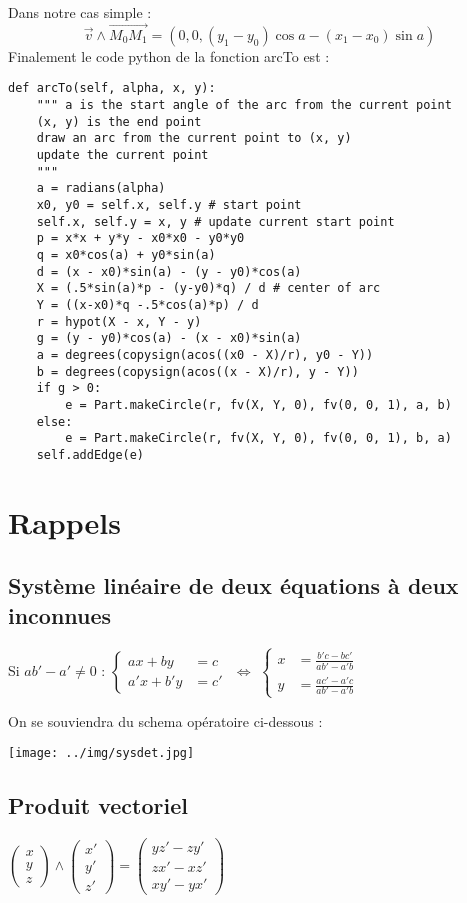 \documentclass[a4paper]{article}
\begin{document}
\bigskip
Dans notre cas simple :
\begin{equation}
\vec{v} \wedge \overrightarrow{M_0 M_1} = (0, 0, (y_1 - y_0)\cos a - (x_1 - x_0)\sin a)
\end{equation}
\bigskip
Finalement le code python de la fonction arcTo est :

\begin{lstlisting}
def arcTo(self, alpha, x, y):
	""" a is the start angle of the arc from the current point
	(x, y) is the end point
	draw an arc from the current point to (x, y)
	update the current point
	"""
	a = radians(alpha)
	x0, y0 = self.x, self.y # start point
	self.x, self.y = x, y # update current start point
	p = x*x + y*y - x0*x0 - y0*y0
	q = x0*cos(a) + y0*sin(a)
	d = (x - x0)*sin(a) - (y - y0)*cos(a)
	X = (.5*sin(a)*p - (y-y0)*q) / d # center of arc
	Y = ((x-x0)*q -.5*cos(a)*p) / d
	r = hypot(X - x, Y - y)
	g = (y - y0)*cos(a) - (x - x0)*sin(a)
	a = degrees(copysign(acos((x0 - X)/r), y0 - Y))
	b = degrees(copysign(acos((x - X)/r), y - Y))
	if g > 0:
		e = Part.makeCircle(r, fv(X, Y, 0), fv(0, 0, 1), a, b)
	else: 
		e = Part.makeCircle(r, fv(X, Y, 0), fv(0, 0, 1), b, a)
	self.addEdge(e)
\end{lstlisting}
\newpage
\section{Rappels}
\subsection{Système linéaire de deux équations à deux inconnues}

Si $ ab' - a' \not= 0 $ :
$\left\{
\begin{array}{ll}
ax + by &= c \\ 
a'x + b'y &= c' 
\end{array}
\right.$
$\Longleftrightarrow$
$\left\{
\begin{array}{ll}
x &= \displaystyle \frac{b'c - bc'}{ab' - a'b} \\
y &= \displaystyle \frac{ac' - a'c}{ab' - a'b}
\end{array}
\right.$

On se souviendra du schema opératoire ci-dessous :

\texttt{[image: ../img/sysdet.jpg]}

\subsection{Produit vectoriel}
$ \left(\begin{array}{l}x \\y \\	z\end{array}\right) \wedge
\left(\begin{array}{l}x' \\y' \\	z'\end{array}\right) =
\left(\begin{array}{l}yz'-zy' \\zx'-xz' \\xy' - yx'\end{array}\right) 
$
\end{document}
